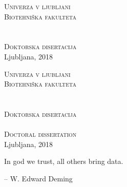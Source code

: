 \begin{titlepage}
\voffset -2cm
\enlargethispage{2cm}
\begin{center}
\Large\textsc{Univerza v ljubljani} \\
\Large\textsc{Biotehniška fakulteta} \\
\vspace{7cm}
\Large\avtor \\
\vspace{2cm}
\LARGE\platnica \\
\vspace{2cm}
\Large \textsc{Doktorska disertacija}\\
\vspace{8cm} %
\Large Ljubljana, 2018 \\
\end{center}
\end{titlepage}

\begin{titlepage}
\voffset -2cm
\enlargethispage{2cm}
\begin{center}
\Large\textsc{Univerza v ljubljani}\\
\Large\textsc{Biotehniška fakulteta}\\
\vspace{6cm}
\avtor \\
\vspace{1cm}
\large \platnica\\
\vspace{0.8cm}
\textsc{Doktorska disertacija}\\
\vspace{2cm}
\large\platnicaEN\\
\vspace{0.8cm}
\textsc{Doctoral dissertation}\\
\vspace{8cm} %
\Large Ljubljana, 2018 \\
\end{center}
\end{titlepage}

\begin{titlepage}
\epigraph{In god we trust, all others bring data.}{-- W. Edward Deming}
\end{titlepage}

\newpage
{}
\setcounter{page}{2}

